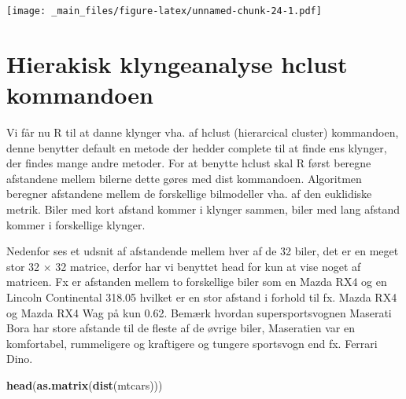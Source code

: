 \documentclass[]{book}
\newenvironment{Shaded}{\begin{snugshade}}{\end{snugshade}}
\newcommand{\KeywordTok}[1]{\textcolor[rgb]{0.13,0.29,0.53}{\textbf{#1}}}
\newcommand{\NormalTok}[1]{#1}
\begin{document}
\texttt{[image: \_main\_files/figure-latex/unnamed-chunk-24-1.pdf]}

\hypertarget{hierakisk-klyngeanalyse-hclust-kommandoen}{%
\section{Hierakisk klyngeanalyse hclust kommandoen}\label{hierakisk-klyngeanalyse-hclust-kommandoen}}

Vi får nu R til at danne klynger vha. af hclust (hierarcical cluster) kommandoen, denne benytter default en metode der hedder complete til at finde ens klynger, der findes mange andre metoder. For at benytte hclust skal R først beregne afstandene mellem bilerne dette gøres med dist kommandoen. Algoritmen beregner afstandene mellem de forskellige bilmodeller vha. af den euklidiske metrik. Biler med kort afstand kommer i klynger sammen, biler med lang afstand kommer i forskellige klynger.

Nedenfor ses et udsnit af afstandende mellem hver af de 32 biler, det er en meget stor 32 \(\times\) 32 matrice, derfor har vi benyttet head for kun at vise noget af matricen. Fx er afstanden mellem to forskellige biler som en Mazda RX4 og en Lincoln Continental 318.05 hvilket er en stor afstand i forhold til fx. Mazda RX4 og Mazda RX4 Wag på kun 0.62. Bemærk hvordan supersportsvognen Maserati Bora har store afstande til de fleste af de øvrige biler, Maseratien var en komfortabel, rummeligere og kraftigere og tungere sportsvogn end fx. Ferrari Dino.

\begin{Shaded}
\begin{Highlighting}[]
\KeywordTok{head}\NormalTok{(}\KeywordTok{as.matrix}\NormalTok{(}\KeywordTok{dist}\NormalTok{(mtcars)))}
\end{Highlighting}
\end{Shaded}
\end{document}
